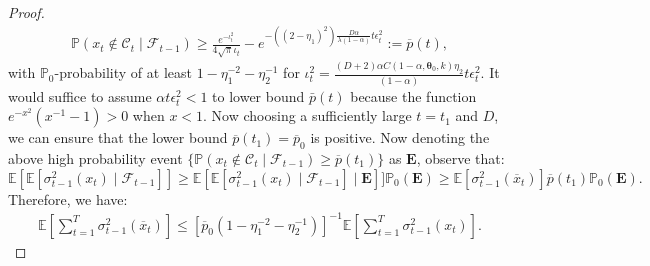 \documentclass[final,12pt]{colt2026} %
\begin{document}
\begin{proof}
\begin{align}
    \mathbb{P}(  x_t \notin \mathcal{C}_t \mid \mathcal{F}_{t-1}  ) \geq \frac{e^{-\iota_t^2}}{4\sqrt{\pi} \iota_t}
     - e^{ - ((2-\eta_1)^2)\frac{D\alpha}{\lambda(1-\alpha)}  t\epsilon_t^2 }:=\overline{p}(t),
     \label{eq:UB1}
\end{align}
with $\mathbb{P}_0$-probability of at least $1-\eta_1^{-2}-\eta_2^{-1}$
    for $\iota_t^2 = \frac{(D+2)\alpha C(1-\alpha,\pmb\theta_0,k)\eta_2 }{ (1-\alpha)}   t\epsilon_t^2$.
It would suffice to assume $\alpha t\epsilon_t^2 <1$ to lower bound $\bar p(t)$ because the function $e^{-x^2}(x^{-1}-1)>0$ when $x<1$.
Now choosing a sufficiently large $t=t_1$ and $D$, we can ensure that the lower bound $\overline{p}(t_1) = \overline{p}_0$ is positive. 
Now denoting the above high probability event $\{\mathbb{P}(  x_t \notin \mathcal{C}_t \mid \mathcal{F}_{t-1}  ) \geq \overline{p}(t_1)\}$ as $\mathbf{E}$, observe that:
\[\mathbb{E}\left[\mathbb{E} \left[ \sigma_{t-1}^2(x_t)\mid\mathcal{F}_{t-1}\right]  \right] \geq \mathbb{E}\left[\mathbb{E} \left[ \sigma_{t-1}^2(x_t)\mid\mathcal{F}_{t-1}\right] \mid\mathbf{E} \right] ]\mathbb{P}_0(\mathbf{E}) \geq \mathbb{E}\left[\sigma_{t-1}^2(\overline{x}_t)\right] \overline{p}(t_1) \mathbb{P}_0(\mathbf{E}). \]
Therefore, we have:
\begin{align}
\mathbb{E} \left[\sum_{t=1}^{T} \sigma_{t-1}^2(\overline{x}_t)\right] \leq [\overline{p}_0(1-\eta_1^{-2}-\eta_2^{-1})]^{-1}\mathbb{E} \left[ \sum_{t=1}^{T} \sigma_{t-1}^2(x_t)\right]. %
\label{eq:LB}
\end{align}


\end{proof}
\end{document}
